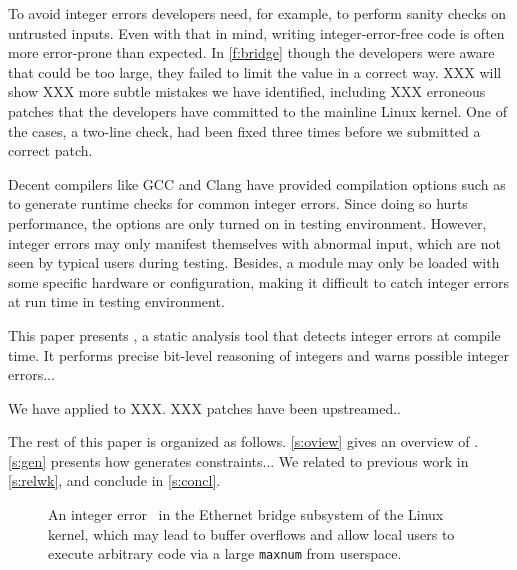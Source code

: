 To avoid integer errors developers need, for example, to perform
sanity checks on untrusted inputs.  Even with that in mind, writing
integer-error-free code is often more error-prone than expected.
In \autoref{f:bridge} though the developers were aware that 
could be too large, they failed to limit the value in a correct
way.  XXX will show XXX more subtle mistakes we have identified,
including XXX erroneous patches that the developers have committed
to the mainline Linux kernel.  One of the cases, a two-line check,
had been fixed three times before we submitted a correct patch.

Decent compilers like GCC and Clang have provided compilation options
such as  to generate runtime checks for common integer
errors.  Since doing so hurts performance, the options are only
turned on in testing environment.  However, integer errors may only
manifest themselves with abnormal input, which are not seen by
typical users during testing.  Besides, a module may only be loaded
with some specific hardware or configuration, making it difficult
to catch integer errors at run time in testing environment.

This paper presents \sys, a static analysis tool that detects integer
errors at compile time.  It performs precise bit-level reasoning
of integers and warns possible integer errors...

We have applied \sys to XXX.  XXX patches have been upstreamed..

The rest of this paper is organized as follows. \autoref{s:oview}
gives an overview of \sys.  \autoref{s:gen} presents how \sys
generates constraints...  We related \sys to previous work in
\autoref{s:relwk}, and conclude in \autoref{s:concl}.

\begin{figure}

\caption{An integer error~\cite[CVE-2006-5751]{cve} in the Ethernet
bridge subsystem of the Linux kernel, which may lead to buffer
overflows and allow local users to execute arbitrary code via a
large \texttt{maxnum} from userspace.}
\label{f:bridge}
\end{figure}
